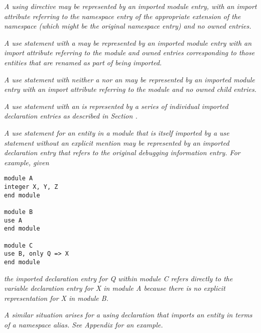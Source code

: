 \textit{A  using directive
may be represented by an imported module
\hypertarget{chap:DWATimportnamespaceusingdirective}{}
entry, with an import attribute referring to the namespace
entry of the appropriate extension of the namespace (which
might be the original namespace entry) and no owned entries.
}

\textit{A  use statement 
with a  may be
represented by an imported module entry with an import
attribute referring to the module and owned entries
corresponding to those entities that are renamed as part of
being imported.
}

\textit{A  use statement
with neither a  nor
an  may be represented by an imported module
entry with an import attribute referring to the module and
no owned child entries.
}

\textit{A use statement with an  is represented by a
series of individual imported declaration entries as described
in Section .
}

\textit{A  use statement for an entity in a module that is
itself imported by a use statement without an explicit mention
may be represented by an imported declaration entry that refers
to the original debugging information entry. For example, given
}

\begin{lstlisting}
module A
integer X, Y, Z
end module

module B
use A
end module

module C
use B, only Q => X
end module
\end{lstlisting}

\textit{the imported declaration entry for Q within module C refers
directly to the variable declaration entry for X in module A
because there is no explicit representation for X in module B.
}

\textit{A similar situation arises for a  using declaration
that imports an entity in terms of a namespace alias. See 
Appendix  
for an example.
}

